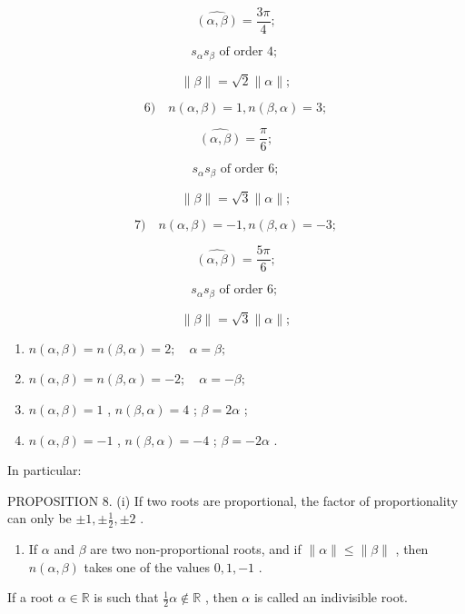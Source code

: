 \[
\widehat {(\alpha , \beta)} = \frac {3 \pi}{4};
\]

\[
s _ {\alpha} s _ {\beta} \text {   of   order   4;   }
\]

\[
\parallel \beta \parallel = \sqrt {2} \parallel \alpha \parallel ;
\]

\[
6) \quad n (\alpha , \beta) = 1, n (\beta , \alpha) = 3;
\]

\[
\widehat {(\alpha , \beta)} = \frac {\pi}{6};
\]

\[
s _ {\alpha} s _ {\beta} \text {   of   order   } 6;
\]

\[
\parallel \beta \parallel = \sqrt {3} \parallel \alpha \parallel ;
\]

\[
7) \quad n (\alpha , \beta) = - 1, n (\beta , \alpha) = - 3;
\]

\[
\widehat {(\alpha , \beta)} = \frac {5 \pi}{6};
\]

\[
s _ {\alpha} s _ {\beta} \text {   of   order   6;   }
\]

\[
\parallel \beta \parallel = \sqrt {3} \parallel \alpha \parallel ;
\]

\begin{enumerate}
\def\labelenumi{\arabic{enumi})}
\setcounter{enumi}{7}
\item
  \(n(\alpha, \beta) = n(\beta, \alpha) = 2; \quad \alpha = \beta;\)
\item
  \(n(\alpha, \beta) = n(\beta, \alpha) = -2; \quad \alpha = -\beta;\)
\item
  \(n(\alpha, \beta) = 1\) , \(n(\beta, \alpha) = 4\) ; \(\beta = 2\alpha\) ;
\item
  \(n(\alpha, \beta) = -1\) , \(n(\beta, \alpha) = -4\) ; \(\beta = -2\alpha\) .
\end{enumerate}

In particular:

PROPOSITION 8. (i) If two roots are proportional, the factor of proportionality can only be \(\pm 1, \pm \frac{1}{2}, \pm 2\) .

\begin{enumerate}
\def\labelenumi{(\roman{enumi})}
\setcounter{enumi}{1}
\tightlist
\item
  If \(\alpha\) and \(\beta\) are two non-proportional roots, and if \(\| \alpha \| \leqslant \| \beta \|\) , then \(n(\alpha, \beta)\) takes one of the values \(0, 1, -1\) .
\end{enumerate}

If a root \(\alpha \in \mathbb{R}\) is such that \(\frac{1}{2}\alpha \notin \mathbb{R}\) , then \(\alpha\) is called an indivisible root.

